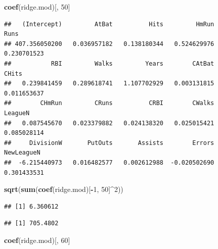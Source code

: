 \documentclass[
  12pt,
]{book}
\newenvironment{Shaded}{\begin{snugshade}}{\end{snugshade}}
\newcommand{\DecValTok}[1]{\textcolor[rgb]{0.00,0.00,0.81}{#1}}
\newcommand{\KeywordTok}[1]{\textcolor[rgb]{0.13,0.29,0.53}{\textbf{#1}}}
\newcommand{\NormalTok}[1]{#1}
\newcommand{\OperatorTok}[1]{\textcolor[rgb]{0.81,0.36,0.00}{\textbf{#1}}}
\theoremstyle{definition}
\theoremstyle{definition}
\theoremstyle{definition}
\theoremstyle{remark}
\begin{document}
\begin{Shaded}
\begin{Highlighting}[]
\KeywordTok{coef}\NormalTok{(ridge.mod)[, }\DecValTok{50}\NormalTok{]}
\end{Highlighting}
\end{Shaded}

\begin{verbatim}
##   (Intercept)         AtBat          Hits         HmRun          Runs 
## 407.356050200   0.036957182   0.138180344   0.524629976   0.230701523 
##           RBI         Walks         Years        CAtBat         CHits 
##   0.239841459   0.289618741   1.107702929   0.003131815   0.011653637 
##        CHmRun         CRuns          CRBI        CWalks       LeagueN 
##   0.087545670   0.023379882   0.024138320   0.025015421   0.085028114 
##     DivisionW       PutOuts       Assists        Errors    NewLeagueN 
##  -6.215440973   0.016482577   0.002612988  -0.020502690   0.301433531
\end{verbatim}

\begin{Shaded}
\begin{Highlighting}[]
\KeywordTok{sqrt}\NormalTok{(}\KeywordTok{sum}\NormalTok{(}\KeywordTok{coef}\NormalTok{(ridge.mod)[}\OperatorTok{-}\DecValTok{1}\NormalTok{, }\DecValTok{50}\NormalTok{]}\OperatorTok{^}\DecValTok{2}\NormalTok{))}
\end{Highlighting}
\end{Shaded}

\begin{verbatim}
## [1] 6.360612
\end{verbatim}

\begin{Shaded}
\end{Shaded}

\begin{verbatim}
## [1] 705.4802
\end{verbatim}

\begin{Shaded}
\begin{Highlighting}[]
\KeywordTok{coef}\NormalTok{(ridge.mod)[, }\DecValTok{60}\NormalTok{]}
\end{Highlighting}
\end{Shaded}
\end{document}
